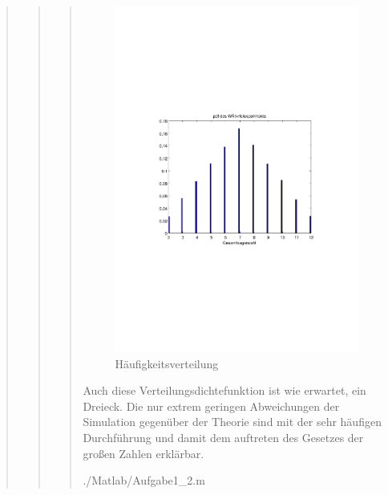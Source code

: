 \begin{quote}
\begin{quote}
\begin{quote}
            \begin{figure}[H]
            \centering
                \includegraphics[scale=0.7, trim = 20mm 80mm 20mm 90mm, clip]{Bilder/A1_2}
                    \caption{Häufigkeitsverteilung}
                    \label{fig:A1_2}
            \end{figure}
            
            Auch diese Verteilungsdichtefunktion ist wie erwartet, ein Dreieck. Die nur extrem geringen Abweichungen der
            Simulation gegenüber der Theorie sind mit der sehr häufigen Durchführung und damit dem auftreten des Gesetzes der
            großen Zahlen erklärbar.
            
            \vspace{3em}
            
                {./Matlab/Aufgabe1_2.m}
                

\end{quote}
\end{quote}
\end{quote}
